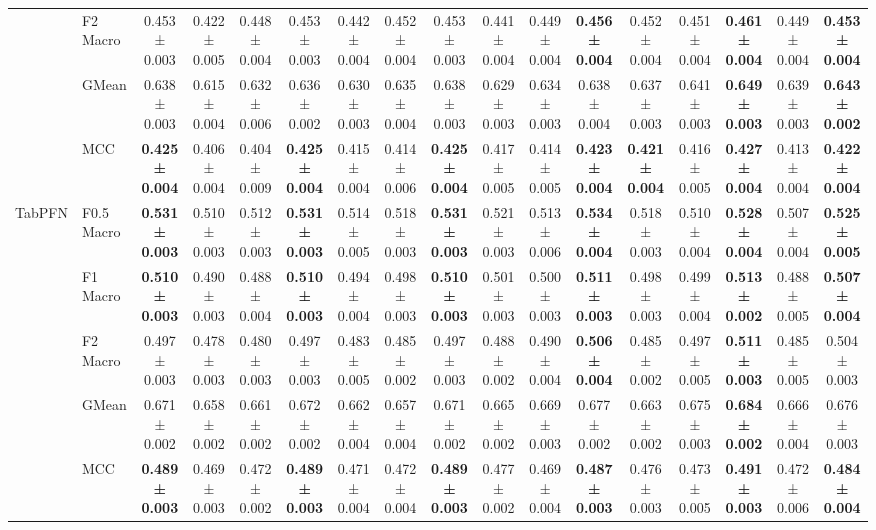 \begin{table}[H]
{\begin{tabular}{llccccccccccccccc}
 & F2 Macro & 0.453 ± 0.003 & 0.422 ± 0.005 & 0.448 ± 0.004 & 0.453 ± 0.003 & 0.442 ± 0.004 & 0.452 ± 0.004 & 0.453 ± 0.003 & 0.441 ± 0.004 & 0.449 ± 0.004 & \textbf{0.456 ± 0.004} & 0.452 ± 0.004 & 0.451 ± 0.004 & \textbf{0.461 ± 0.004} & 0.449 ± 0.004 & \textbf{0.453 ± 0.004} \\
 & GMean & 0.638 ± 0.003 & 0.615 ± 0.004 & 0.632 ± 0.006 & 0.636 ± 0.002 & 0.630 ± 0.003 & 0.635 ± 0.004 & 0.638 ± 0.003 & 0.629 ± 0.003 & 0.634 ± 0.003 & 0.638 ± 0.004 & 0.637 ± 0.003 & 0.641 ± 0.003 & \textbf{0.649 ± 0.003} & 0.639 ± 0.003 & \textbf{0.643 ± 0.002} \\
 & MCC & \textbf{0.425 ± 0.004} & 0.406 ± 0.004 & 0.404 ± 0.009 & \textbf{0.425 ± 0.004} & 0.415 ± 0.004 & 0.414 ± 0.006 & \textbf{0.425 ± 0.004} & 0.417 ± 0.005 & 0.414 ± 0.005 & \textbf{0.423 ± 0.004} & \textbf{0.421 ± 0.004} & 0.416 ± 0.005 & \textbf{0.427 ± 0.004} & 0.413 ± 0.004 & \textbf{0.422 ± 0.004} \\
\cline{1-17}
\multirow[t]{5}{*}{TabPFN} & F0.5 Macro & \textbf{0.531 ± 0.003} & 0.510 ± 0.003 & 0.512 ± 0.003 & \textbf{0.531 ± 0.003} & 0.514 ± 0.005 & 0.518 ± 0.003 & \textbf{0.531 ± 0.003} & 0.521 ± 0.003 & 0.513 ± 0.006 & \textbf{0.534 ± 0.004} & 0.518 ± 0.003 & 0.510 ± 0.004 & \textbf{0.528 ± 0.004} & 0.507 ± 0.004 & \textbf{0.525 ± 0.005} \\
 & F1 Macro & \textbf{0.510 ± 0.003} & 0.490 ± 0.003 & 0.488 ± 0.004 & \textbf{0.510 ± 0.003} & 0.494 ± 0.004 & 0.498 ± 0.003 & \textbf{0.510 ± 0.003} & 0.501 ± 0.003 & 0.500 ± 0.003 & \textbf{0.511 ± 0.003} & 0.498 ± 0.003 & 0.499 ± 0.004 & \textbf{0.513 ± 0.002} & 0.488 ± 0.005 & \textbf{0.507 ± 0.004} \\
 & F2 Macro & 0.497 ± 0.003 & 0.478 ± 0.003 & 0.480 ± 0.003 & 0.497 ± 0.003 & 0.483 ± 0.005 & 0.485 ± 0.002 & 0.497 ± 0.003 & 0.488 ± 0.002 & 0.490 ± 0.004 & \textbf{0.506 ± 0.004} & 0.485 ± 0.002 & 0.497 ± 0.005 & \textbf{0.511 ± 0.003} & 0.485 ± 0.005 & 0.504 ± 0.003 \\
 & GMean & 0.671 ± 0.002 & 0.658 ± 0.002 & 0.661 ± 0.002 & 0.672 ± 0.002 & 0.662 ± 0.004 & 0.657 ± 0.004 & 0.671 ± 0.002 & 0.665 ± 0.002 & 0.669 ± 0.003 & 0.677 ± 0.002 & 0.663 ± 0.002 & 0.675 ± 0.003 & \textbf{0.684 ± 0.002} & 0.666 ± 0.004 & 0.676 ± 0.003 \\
 & MCC & \textbf{0.489 ± 0.003} & 0.469 ± 0.003 & 0.472 ± 0.002 & \textbf{0.489 ± 0.003} & 0.471 ± 0.004 & 0.472 ± 0.004 & \textbf{0.489 ± 0.003} & 0.477 ± 0.002 & 0.469 ± 0.004 & \textbf{0.487 ± 0.003} & 0.476 ± 0.003 & 0.473 ± 0.005 & \textbf{0.491 ± 0.003} & 0.472 ± 0.006 & \textbf{0.484 ± 0.004} \\

\end{tabular}}
\end{table}
